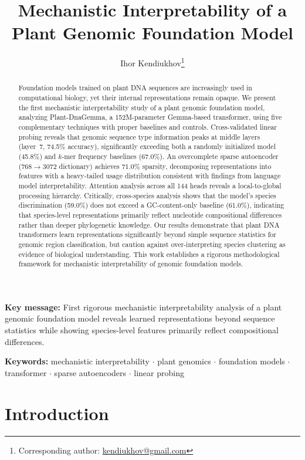 \documentclass[12pt]{article}
\title{Mechanistic Interpretability of a Plant Genomic Foundation Model}
\author[1]{Ihor Kendiukhov\thanks{Corresponding author: \href{mailto:kendiukhov@gmail.com}{kendiukhov@gmail.com}}}
\affil[1]{Department of Computer Science, University of T\"ubingen, T\"ubingen, Germany}
\date{}
\begin{document}
\maketitle

\begin{abstract}
Foundation models trained on plant DNA sequences are increasingly used in computational biology, yet their internal representations remain opaque. We present the first mechanistic interpretability study of a plant genomic foundation model, analyzing Plant-DnaGemma, a 152M-parameter Gemma-based transformer, using five complementary techniques with proper baselines and controls. Cross-validated linear probing reveals that genomic sequence type information peaks at middle layers (layer~7, 74.5\% accuracy), significantly exceeding both a randomly initialized model (45.8\%) and $k$-mer frequency baselines (67.0\%). An overcomplete sparse autoencoder (768$\to$3072 dictionary) achieves 71.0\% sparsity, decomposing representations into features with a heavy-tailed usage distribution consistent with findings from language model interpretability. Attention analysis across all 144 heads reveals a local-to-global processing hierarchy. Critically, cross-species analysis shows that the model's species discrimination (59.0\%) does not exceed a GC-content-only baseline (61.0\%), indicating that species-level representations primarily reflect nucleotide compositional differences rather than deeper phylogenetic knowledge. Our results demonstrate that plant DNA transformers learn representations significantly beyond simple sequence statistics for genomic region classification, but caution against over-interpreting species clustering as evidence of biological understanding. This work establishes a rigorous methodological framework for mechanistic interpretability of genomic foundation models.
\end{abstract}

\noindent\textbf{Key message:} First rigorous mechanistic interpretability analysis of a plant genomic foundation model reveals learned representations beyond sequence statistics while showing species-level features primarily reflect compositional differences.

\medskip

\noindent\textbf{Keywords:} mechanistic interpretability $\cdot$ plant genomics $\cdot$ foundation models $\cdot$ transformer $\cdot$ sparse autoencoders $\cdot$ linear probing

\linenumbers

\section{Introduction}
\end{document}
